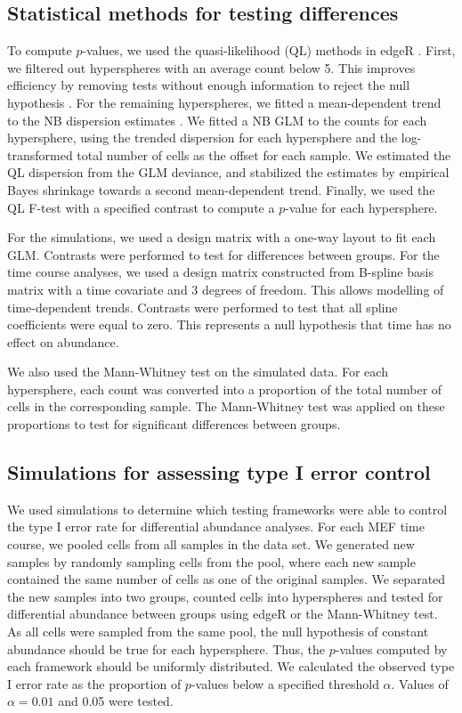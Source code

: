 \documentclass{article}
\begin{document}
\subsection{Statistical methods for testing differences}
To compute $p$-values, we used the quasi-likelihood (QL) methods in edgeR \cite{lund2012detecting}.
First, we filtered out hyperspheres with an average count below 5.
This improves efficiency by removing tests without enough information to reject the null hypothesis \cite{bourgon2010independent}.
For the remaining hyperspheres, we fitted a mean-dependent trend to the NB dispersion estimates \cite{mccarthy2012differential}.
We fitted a NB GLM to the counts for each hypersphere, using the trended dispersion for each hypersphere and the log-transformed total number of cells as the offset for each sample.
We estimated the QL dispersion from the GLM deviance, and stabilized the estimates by empirical Bayes shrinkage towards a second mean-dependent trend.
Finally, we used the QL F-test with a specified contrast to compute a $p$-value for each hypersphere.

For the simulations, we used a design matrix with a one-way layout to fit each GLM.
Contrasts were performed to test for differences between groups.
For the time course analyses, we used a design matrix constructed from B-spline basis matrix with a time covariate and 3 degrees of freedom.
This allows modelling of time-dependent trends.
Contrasts were performed to test that all spline coefficients were equal to zero.
This represents a null hypothesis that time has no effect on abundance.

We also used the Mann-Whitney test on the simulated data.
For each hypersphere, each count was converted into a proportion of the total number of cells in the corresponding sample.
The Mann-Whitney test was applied on these proportions to test for significant differences between groups.

\subsection{Simulations for assessing type I error control}
We used simulations to determine which testing frameworks were able to control the type I error rate for differential abundance analyses.
For each MEF time course, we pooled cells from all samples in the data set.
We generated new samples by randomly sampling cells from the pool, where each new sample contained the same number of cells as one of the original samples.
We separated the new samples into two groups, counted cells into hyperspheres and tested for differential abundance between groups using edgeR or the Mann-Whitney test.
As all cells were sampled from the same pool, the null hypothesis of constant abundance should be true for each hypersphere.
Thus, the $p$-values computed by each framework should be uniformly distributed.
We calculated the observed type I error rate as the proportion of $p$-values below a specified threshold $\alpha$.
Values of $\alpha=0.01$ and 0.05 were tested.
\end{document}
